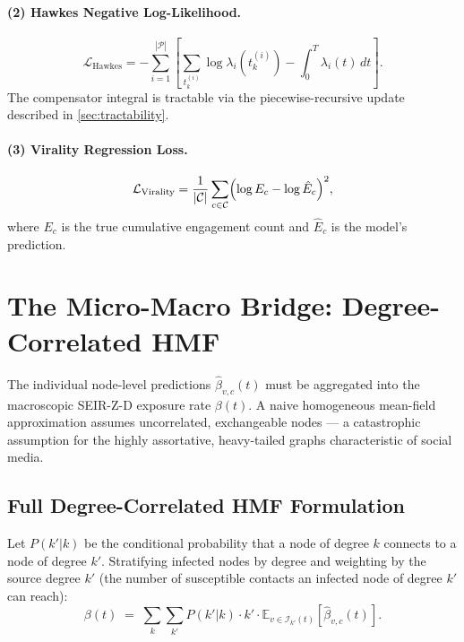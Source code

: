 \documentclass[11pt]{article}
\newcommand{\cI}{\mathcal{I}}
\newcommand{\cC}{\mathcal{C}}
\newcommand{\cP}{\mathcal{P}}
\begin{document}
\paragraph{(2) Hawkes Negative Log-Likelihood.}
\begin{equation}
  \mathcal{L}_{\mathrm{Hawkes}}
  = -\sum_{i=1}^{|\cP|}
  \left[
    \sum_{t_k^{(i)}} \log\lambda_i\!\left(t_k^{(i)}\right)
    - \int_0^T \lambda_i(t)\,dt
  \right].
  \label{eq:hawkes-nll}
\end{equation}
The compensator integral is tractable via the piecewise-recursive update
described in \cref{sec:tractability}.

\paragraph{(3) Virality Regression Loss.}
\begin{equation}
  \mathcal{L}_{\mathrm{Virality}}
  = \frac{1}{|\cC|}
  \sum_{c\in\cC}
  \Bigl(\log E_c - \log\hat{E}_c\Bigr)^2,
  \label{eq:virality-loss}
\end{equation}
where $E_c$ is the true cumulative engagement count and $\hat{E}_c$ is the
model's prediction.

\section{The Micro-Macro Bridge: Degree-Correlated HMF}
\label{sec:hmf}

The individual node-level predictions $\hat{\beta}_{v,c}(t)$ must be aggregated
into the macroscopic SEIR-Z-D exposure rate $\beta(t)$. A naive homogeneous
mean-field approximation assumes uncorrelated, exchangeable nodes --- a
catastrophic assumption for the highly assortative, heavy-tailed graphs
characteristic of social media.

\subsection{Full Degree-Correlated HMF Formulation}

Let $P(k'|k)$ be the conditional probability that a node of degree $k$ connects
to a node of degree $k'$. Stratifying infected nodes by degree and weighting by
the source degree $k'$ (the number of susceptible contacts an infected node of
degree $k'$ can reach):
\begin{equation}
  \beta(t)
  \;=\;
  \sum_{k}\sum_{k'}
  P(k'|k)\cdot k'\cdot
  \mathbb{E}_{v\in\cI_{k'}(t)}\!\left[\hat{\beta}_{v,c}(t)\right].
  \label{eq:hmf}
\end{equation}
\end{document}
